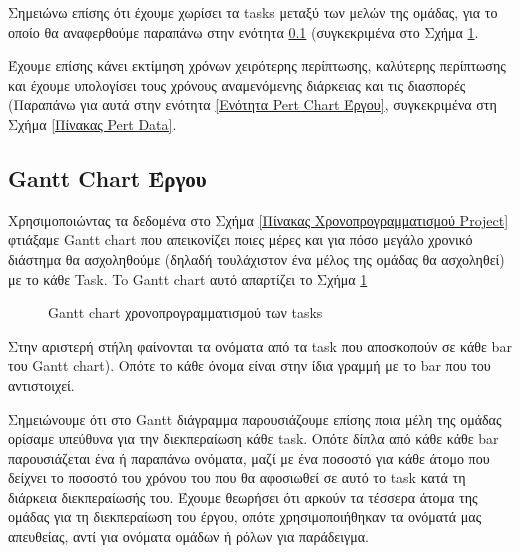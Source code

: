 \documentclass[12pt,a4paper]{article}
\begin{document}
Σημειώνω επίσης ότι έχουμε χωρίσει τα tasks μεταξύ των μελών της ομάδας, για το οποίο θα αναφερθούμε παραπάνω στην ενότητα \ref{Εντότητα Gantt Chart Έργου} (συγκεκριμένα στο Σχήμα \ref{Gantt chart χρονοπρογραμματισμού των tasks}.

Έχουμε επίσης κάνει εκτίμηση χρόνων χειρότερης περίπτωσης, καλύτερης περίπτωσης και έχουμε υπολογίσει τους χρόνους αναμενόμενης διάρκειας και τις διασπορές (Παραπάνω για αυτά στην ενότητα \ref{Ενότητα Pert Chart Έργου}, συγκεκριμένα στη Σχήμα \ref{Πίνακας Pert Data}.

\subsection{Gantt Chart Έργου}
\label{Εντότητα Gantt Chart Έργου}
Χρησιμοποιώντας τα δεδομένα στο Σχήμα \ref{Πίνακας Χρονοπρογραμματισμού Project} φτιάξαμε Gantt chart που απεικονίζει ποιες μέρες και για πόσο μεγάλο χρονικό διάστημα θα ασχοληθούμε (δηλαδή τουλάχιστον ένα μέλος της ομάδας θα ασχοληθεί) με το κάθε Task. To Gantt chart αυτό απαρτίζει το Σχήμα \ref{Gantt chart χρονοπρογραμματισμού των tasks}

\begin{figure}[H]
	\caption{Gantt chart χρονοπρογραμματισμού των tasks}
	\label{Gantt chart χρονοπρογραμματισμού των tasks}
\end{figure}

Στην αριστερή στήλη φαίνονται τα ονόματα από τα task που αποσκοπούν σε κάθε bar του Gantt chart). Οπότε το κάθε όνομα είναι στην ίδια γραμμή με το bar που του αντιστοιχεί.

Σημειώνουμε ότι στο Gantt διάγραμμα παρουσιάζουμε επίσης ποια μέλη της ομάδας ορίσαμε υπεύθυνα για την διεκπεραίωση κάθε task. Οπότε δίπλα από κάθε κάθε bar παρουσιάζεται ένα ή παραπάνω ονόματα, μαζί με ένα ποσοστό για κάθε άτομο που δείχνει το ποσοστό του χρόνου του που θα αφοσιωθεί σε αυτό το task κατά τη διάρκεια διεκπεραίωσής του. Έχουμε θεωρήσει ότι αρκούν τα τέσσερα άτομα της ομάδας για τη διεκπεραίωση του έργου, οπότε χρησιμοποιήθηκαν τα ονόματά μας απευθείας, αντί για ονόματα ομάδων ή ρόλων για παράδειγμα.
\end{document}
